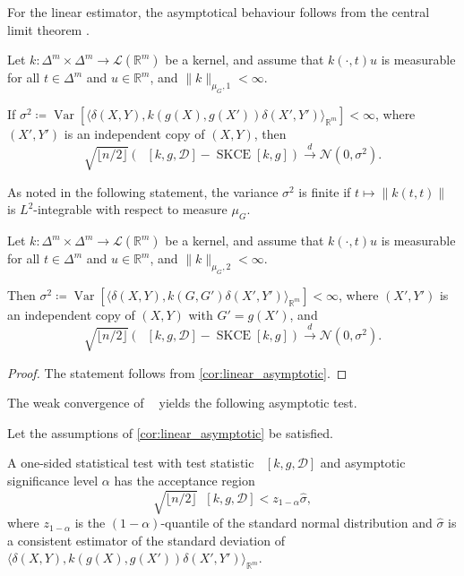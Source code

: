 \documentclass{article}
\DeclareMathOperator{\Var}{Var}
\DeclareMathOperator{\squaredkernelmeasure}{SKCE}
\DeclareMathOperator{\linearestimator}{\widehat{SKCE}_{ul}}
\begin{document}
For the linear estimator, the asymptotical behaviour follows from the central
limit theorem
\citep[e.g., Theorem~A in Section 1.9][]{serfling80_approx_theor_mathem_statis}.

\begin{corollary}\label{cor:linear_asymptotic}
  Let $k \colon \Delta^m \times \Delta^m \to \mathcal{L}(\mathbb{R}^m)$ be a
  kernel, and assume that $k(\cdot,t) u$ is measurable for all $t \in \Delta^m$
  and $u \in \mathbb{R}^m$, and $\|k\|_{\mu_G,1} < \infty$.

  If $\sigma^2 \coloneqq \Var[\langle \delta(X,Y), k(g(X),g(X')) \delta(X',Y')\rangle_{\mathbb{R}^m}] < \infty$,
  where $(X',Y')$ is an independent copy of $(X,Y)$, then
  \begin{equation*}
    \sqrt{\lfloor n/ 2\rfloor} \left(\linearestimator[k, g, \mathcal{D}] - \squaredkernelmeasure[k, g]\right) \xrightarrow{d} \mathcal{N}(0, \sigma^2).
  \end{equation*}
\end{corollary}

As noted in the following statement, the variance $\sigma^2$ is finite if
$t \mapsto \|k(t,t)\|$ is $L^2$-integrable with respect to measure $\mu_G$.

\begin{corollary}
  Let $k \colon \Delta^m \times \Delta^m \to \mathcal{L}(\mathbb{R}^m)$ be a
  kernel, and assume that $k(\cdot,t) u$ is measurable for all $t \in \Delta^m$
  and $u \in \mathbb{R}^m$, and $\|k\|_{\mu_G,2} < \infty$.

  Then $\sigma^2 \coloneqq \Var[\langle \delta(X,Y), k(G,G') \delta(X',Y')\rangle_{\mathbb{R}^m}] < \infty$,
  where $(X',Y')$ is an independent copy of $(X,Y)$ with $G'= g(X')$, and
  \begin{equation*}
    \sqrt{\lfloor n/ 2\rfloor} \left(\linearestimator[k, g, \mathcal{D}] - \squaredkernelmeasure[k, g]\right) \xrightarrow{d} \mathcal{N}(0, \sigma^2).
  \end{equation*}
\end{corollary}

\begin{proof}
 The statement follows from \cref{cor:linear_asymptotic}.
\end{proof}

The weak convergence of $\linearestimator$ yields the following asymptotic test.

\begin{corollary}
  Let the assumptions of \cref{cor:linear_asymptotic} be satisfied.

  A one-sided statistical test with test statistic
  $\linearestimator[k, g, \mathcal{D}]$ and asymptotic significance level
  $\alpha$ has the acceptance region
  \begin{equation*}
    \sqrt{\lfloor n / 2\rfloor} \linearestimator[k, g, \mathcal{D}] < z_{1-\alpha} \hat{\sigma},
  \end{equation*}
  where $z_{1-\alpha}$ is the $(1-\alpha)$-quantile of the standard normal
  distribution and $\hat{\sigma}$ is a consistent estimator of the standard
  deviation of
  $\langle \delta(X,Y), k(g(X),g(X')) \delta(X',Y')\rangle_{\mathbb{R}^m}$.
\end{corollary}
\end{document}
